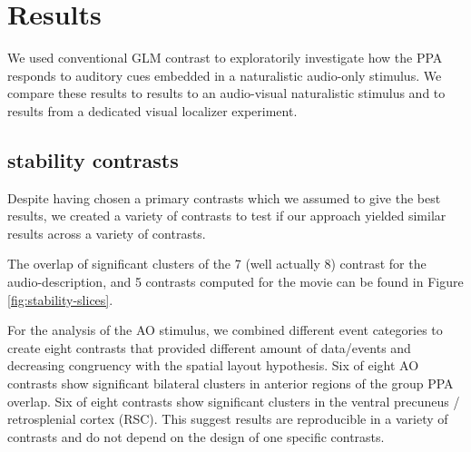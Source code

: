 \documentclass[english]{article}
\begin{document}
\section{Results}


We used conventional GLM contrast to exploratorily investigate how the PPA
responds to auditory cues embedded in a naturalistic audio-only stimulus.
We compare these results to results to an audio-visual naturalistic stimulus and
to results from a dedicated visual localizer experiment.



\subsection{stability contrasts}

Despite having chosen a primary contrasts which we assumed to give the best
results, we created a variety of contrasts to test if our approach yielded
similar results across a variety of contrasts.

The overlap of significant clusters of the 7 (well actually 8) contrast for the
audio-description, and 5 contrasts computed for the movie can be found in Figure
\ref{fig:stability-slices}.

For the analysis of the AO stimulus, we combined different event categories to
create eight contrasts that provided different amount of data/events and
decreasing congruency with the spatial layout hypothesis.
Six of eight AO contrasts show significant bilateral clusters in anterior
regions of the group PPA overlap.
Six of eight contrasts show significant clusters in the ventral precuneus /
retrosplenial cortex (RSC).
This suggest results are reproducible in a variety of contrasts and do not
depend on the design of one specific contrasts.
\end{document}
